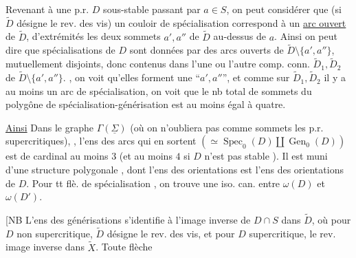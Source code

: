 

Revenant à une p.r. $D$ sous-stable passant par $a\in S$, on peut considérer que  (si $\widetilde D$ désigne le rev. des vis) un couloir de spécialisation correspond à un \uline{arc ouvert} de $\widetilde D$, d'extrémités les deux sommets $a',a''$ de $\widetilde D$ au-dessus de $a$.   Ainsi on peut dire que  spécialisations de $D$ sont données par des arcs ouverts de $\widetilde D\setminus\{a',a''\}$, mutuellement disjoints, donc contenus dans l'une ou l'autre comp. conn. $\widetilde D_1,\widetilde D_2$ de $\widetilde D\setminus\{a',a''\}$. , on voit qu'elles forment une  ``$a',a''$'', et comme sur $\widetilde D_1,\widetilde D_2$ il y a au moins un arc de spécialisation, on voit que le nb total de sommets du polygône de spécialisation-générisation est au moins égal à quatre. 

\uline{Ainsi} Dans le graphe  $\Gamma(\underline\Sigma)$ (où on n'oubliera pas comme sommets les p.r. supercritiques), , l'ens des  arcs qui en sortent $(\simeq\operatorname{Spec}_0(D)\amalg\operatorname{Gen}_0(D))$ est de cardinal au moins $3$ (et au moins $4$ si $D$ n'est pas stable ). Il est muni d'une structure polygonale , dont l'ens des orientations est  l'ens des orientations de $D$. Pour tt flè. de spécialisation , on trouve une iso. can. entre $\omega(D)$ et $\omega(D')$.

[NB L'ens des générisations   s'identifie à l'image  inverse de $D\cap S$ dans $\widetilde D$, où pour $D$ non supercritique, $\widetilde D$ désigne le rev. des vis, et pour $D$ supercritique, le rev. image inverse dans $\widetilde X$. Toute flèche

